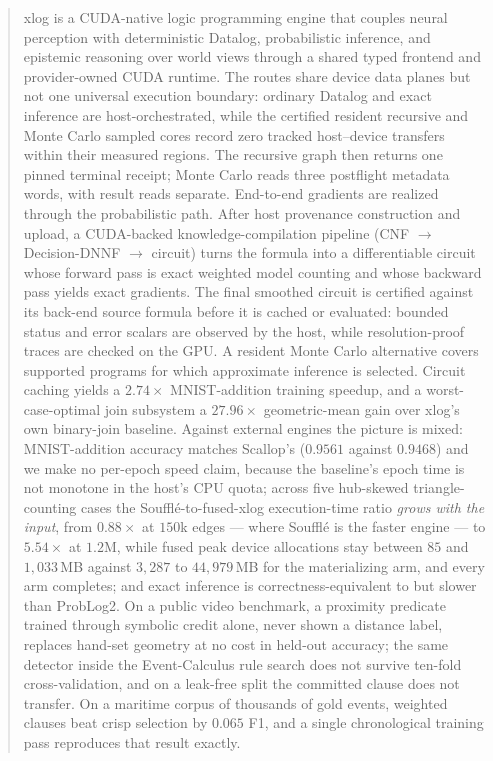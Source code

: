 \begin{abstract}
\noindent
xlog is a CUDA-native logic programming engine that couples neural perception with deterministic Datalog, probabilistic inference, and epistemic reasoning over world views through a shared typed frontend and provider-owned CUDA runtime. The routes share device data planes but not one universal execution boundary: ordinary Datalog and exact inference are host-orchestrated, while the certified resident recursive and Monte Carlo sampled cores record zero tracked host--device transfers within their measured regions. The recursive graph then returns one pinned terminal receipt; Monte Carlo reads three postflight metadata words, with result reads separate. End-to-end gradients are realized through the probabilistic path. After host provenance construction and upload, a CUDA-backed knowledge-compilation pipeline (CNF $\to$ Decision-DNNF $\to$ circuit) turns the formula into a differentiable circuit whose forward pass is exact weighted model counting and whose backward pass yields exact gradients. The final smoothed circuit is certified against its back-end source formula before it is cached or evaluated: bounded status and error scalars are observed by the host, while resolution-proof traces are checked on the GPU. A resident Monte Carlo alternative covers supported programs for which approximate inference is selected. Circuit caching yields a $2.74\times$ MNIST-addition training speedup, and a worst-case-optimal join subsystem a $27.96\times$ geometric-mean gain over xlog's own binary-join baseline. Against external engines the picture is mixed: MNIST-addition accuracy matches Scallop's ($0.9561$ against $0.9468$) and we make no per-epoch speed claim, because the baseline's epoch time is not monotone in the host's CPU quota; across five hub-skewed triangle-counting cases the Soufflé-to-fused-xlog execution-time ratio \emph{grows with the input}, from $0.88\times$ at $150$k edges --- where Soufflé is the faster engine --- to $5.54\times$ at $1.2$M, while fused peak device allocations stay between $85$ and $1{,}033$\,MB against $3{,}287$ to $44{,}979$\,MB for the materializing arm, and every arm completes; and exact inference is correctness-equivalent to but slower than ProbLog2. On a public video benchmark, a proximity predicate trained through symbolic credit alone, never shown a distance label, replaces hand-set geometry at no cost in held-out accuracy; the same detector inside the Event-Calculus rule search does not survive ten-fold cross-validation, and on a leak-free split the committed clause does not transfer. On a maritime corpus of thousands of gold events, weighted clauses beat crisp selection by $0.065$ F1, and a single chronological training pass reproduces that result exactly.
\end{abstract}
